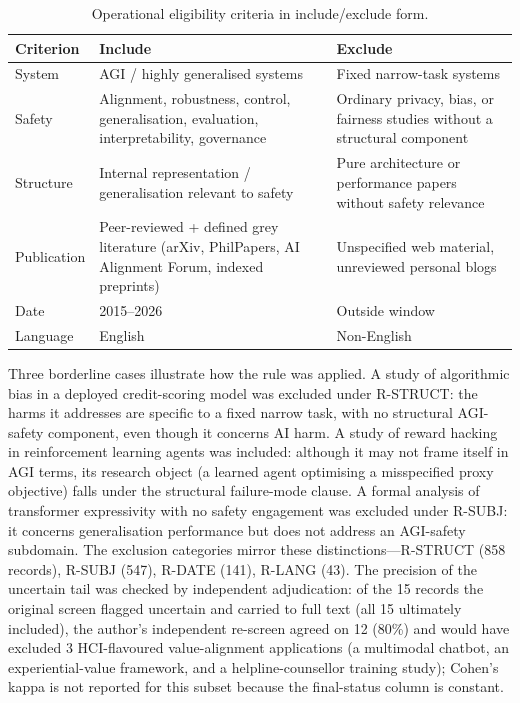 \begin{table}[htbp]
\centering
\caption{Operational eligibility criteria in include/exclude form.}
\label{tab:eligibility}
\begin{tabular}{p{2.2cm} p{5.6cm} p{5.6cm}}
\toprule
Criterion & Include & Exclude \\
\midrule
System & AGI / highly generalised systems & Fixed narrow-task systems \\
Safety & Alignment, robustness, control, generalisation, evaluation, interpretability, governance & Ordinary privacy, bias, or fairness studies without a structural component \\
Structure & Internal representation / generalisation relevant to safety & Pure architecture or performance papers without safety relevance \\
Publication & Peer-reviewed + defined grey literature (arXiv, PhilPapers, AI Alignment Forum, indexed preprints) & Unspecified web material, unreviewed personal blogs \\
Date & 2015--2026 & Outside window \\
Language & English & Non-English \\
\bottomrule
\end{tabular}
\end{table}

Three borderline cases illustrate how the rule was applied. A study of algorithmic bias in a deployed credit-scoring model was excluded under R-STRUCT: the harms it addresses are specific to a fixed narrow task, with no structural AGI-safety component, even though it concerns AI harm. A study of reward hacking in reinforcement learning agents was included: although it may not frame itself in AGI terms, its research object (a learned agent optimising a misspecified proxy objective) falls under the structural failure-mode clause. A formal analysis of transformer expressivity with no safety engagement was excluded under R-SUBJ: it concerns generalisation performance but does not address an AGI-safety subdomain. The exclusion categories mirror these distinctions---R-STRUCT (858 records), R-SUBJ (547), R-DATE (141), R-LANG (43). The precision of the uncertain tail was checked by independent adjudication: of the 15 records the original screen flagged uncertain and carried to full text (all 15 ultimately included), the author's independent re-screen agreed on 12 (80\%) and would have excluded 3 HCI-flavoured value-alignment applications (a multimodal chatbot, an experiential-value framework, and a helpline-counsellor training study); Cohen's kappa is not reported for this subset because the final-status column is constant.

